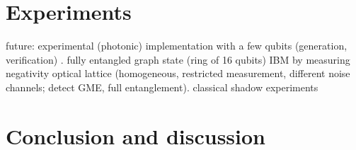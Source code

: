 \documentclass[
reprint,
aps,
pra,
floatfix,
]{revtex4-2}
\theoremstyle{plain}
\theoremstyle{definition}
\begin{document}



\section{Experiments}\label{sec:experiments}
future: experimental (photonic) implementation with a few qubits (generation, verification) \cite{luEntanglementStructureEntanglement2018}.
fully entangled graph state (ring of 16 qubits) IBM by measuring negativity \cite{wang16qubitIBMUniversal2018}
optical lattice \cite{zhouSchemeCreateVerify2022} (homogeneous, restricted measurement, different noise channels; detect GME, full entanglement).
classical shadow experiments \cite{zhangExperimentalQuantumState2021}
\cite{elbenMixedstateEntanglementLocal2020}

\section{Conclusion and discussion}

\begin{acknowledgments}
\end{acknowledgments}



%


\onecolumngrid
\appendix



\end{document}
